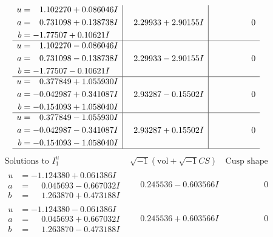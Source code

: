 \documentclass[1p]{elsarticle_modified}
\theoremstyle{definition}
\newcommand{\I}{\sqrt{-1}}
\begin{document}
$$\begin{array}{c|c|c}
\begin{aligned}
u &= \phantom{-}1.102270 + 0.086046 I \\
a &= \phantom{-}0.731098 + 0.138738 I \\
b &= -1.77507 + 0.10621 I\end{aligned}
 & \phantom{-}2.29933 + 2.90155 I & \phantom{-0.000000 } 0 \\ \hline\begin{aligned}
u &= \phantom{-}1.102270 - 0.086046 I \\
a &= \phantom{-}0.731098 - 0.138738 I \\
b &= -1.77507 - 0.10621 I\end{aligned}
 & \phantom{-}2.29933 - 2.90155 I & \phantom{-0.000000 } 0 \\ \hline\begin{aligned}
u &= \phantom{-}0.377849 + 1.055930 I \\
a &= -0.042987 + 0.341087 I \\
b &= -0.154093 + 1.058040 I\end{aligned}
 & \phantom{-}2.93287 - 0.15502 I & \phantom{-0.000000 } 0 \\ \hline\begin{aligned}
u &= \phantom{-}0.377849 - 1.055930 I \\
a &= -0.042987 - 0.341087 I \\
b &= -0.154093 - 1.058040 I\end{aligned}
 & \phantom{-}2.93287 + 0.15502 I & \phantom{-0.000000 } 0\\
 \hline 
 \end{array}$$\newpage$$\begin{array}{c|c|c}  
\text{Solutions to }I^u_{1}& \I (\text{vol} + \sqrt{-1}CS) & \text{Cusp shape}\\
 \hline 
\begin{aligned}
u &= -1.124380 + 0.061386 I \\
a &= \phantom{-}0.045693 - 0.667032 I \\
b &= \phantom{-}1.263870 + 0.473188 I\end{aligned}
 & \phantom{-}0.245536 - 0.603566 I & \phantom{-0.000000 } 0 \\ \hline\begin{aligned}
u &= -1.124380 - 0.061386 I \\
a &= \phantom{-}0.045693 + 0.667032 I \\
b &= \phantom{-}1.263870 - 0.473188 I\end{aligned}
 & \phantom{-}0.245536 + 0.603566 I & \phantom{-0.000000 } 0 \\ \hline\begin{aligned}

\end{aligned}
\end{array}$$
\end{document}
